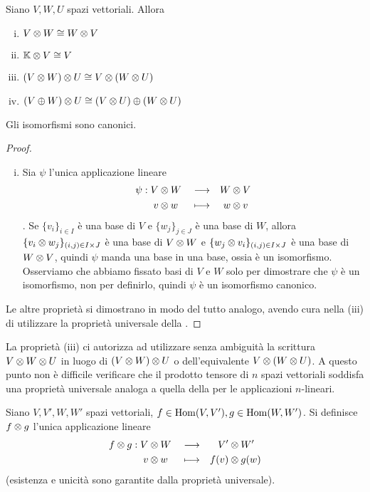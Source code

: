 \begin{proposition}
Siano $V\comma W\comma U$ spazi vettoriali. Allora
\begin{enumerate}[(i)]
\item $V\otimes W\cong W\otimes V$
\item $\mathbb{K}\otimes V\cong V$
\item $(V\otimes W)\otimes U\cong V\otimes(W\otimes U)$
\item $(V\oplus W)\otimes U\cong(V\otimes U)\oplus(W\otimes U)$
\end{enumerate}
Gli isomorfismi sono canonici.
\end{proposition}
\begin{proof}\leavevmode
\begin{enumerate}[(i)]
\item Sia $\psi$ l'unica applicazione lineare
\begin{alignat*}{3}
\psi:V&\otimes W&&\longrightarrow &W&\otimes V\\
v&\otimes w&&\longmapsto&w&\otimes v
\end{alignat*}
 . Se $\{v_i\}_{i\in I}$ è una base di $V$ e $\{w_j\}_{j\in J}$ è una base di $W$, allora $\{v_i\otimes w_j\}_{(i,j)\in I\times J}$ è una base di $V\otimes W$ e $\{w_j\otimes v_i\}_{(i,j)\in I\times J}$ è una base di $W\otimes V$, quindi $\psi$ manda una base in una base, ossia è un isomorfismo. Osserviamo che abbiamo fissato basi di $V$ e $W$ solo per dimostrare che $\psi$ è un isomorfismo, non per definirlo, quindi $\psi$ è un isomorfismo canonico.
\end{enumerate}
Le altre proprietà si dimostrano in modo del tutto analogo, avendo cura nella (iii) di utilizzare la proprietà universale della .
\end{proof}

La proprietà (iii) ci autorizza ad utilizzare senza ambiguità la scrittura $V\otimes W\otimes U$ in luogo di $(V\otimes W)\otimes U$ o dell'equivalente $V\otimes(W\otimes U)$. A questo punto non è difficile verificare che il prodotto tensore di $n$ spazi vettoriali soddisfa una proprietà universale analoga a quella della  per le applicazioni $n$-lineari.

\begin{definition}
Siano $V\comma V'\comma W\comma W'$ spazi vettoriali, $f\in\operatorname{Hom}(V,V'),\allowbreak g\in\operatorname{Hom}(W,W')$. Si definisce $f\otimes g$ l'unica applicazione lineare
\begin{alignat*}{3}
f\otimes g:V&\otimes W&&\longrightarrow &V'&\otimes W'\\
v&\otimes w&&\longmapsto &f(v)&\otimes g(w)
\end{alignat*}
(esistenza e unicità sono garantite dalla proprietà universale).
\end{definition}

